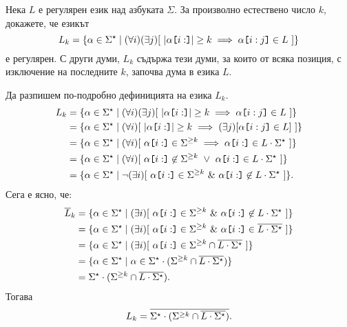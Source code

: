 \begin{extra}
\begin{problem}
  Нека $L$ е регулярен език над азбуката $\Sigma$.
  За произволно естествено число $k$, докажете, че езикът
  \[L_k = \{ \alpha \in \Sigma^\star \mid (\forall i)(\exists j)[\ |\alpha\texttt{[}{i:}\texttt{]}| \geq k \implies \alpha\texttt{[}{i:j}\texttt{]} \in L\ ]\}\]
  е регулярен.
  С други думи, $L_k$ съдържа тези думи, за които от всяка позиция, с изключение на последните $k$, започва дума в езика $L$.
\end{problem}
\ifhints
\begin{hint}
  Да разпишем по-подробно дефиницията на езика $L_k$.
  \begin{align*}
    L_k & = \{ \alpha \in \Sigma^\star \mid (\forall i)(\exists j)[\ |\alpha\slice{i:}| \geq k \implies \alpha\slice{i:j} \in L\ ]\}\\
        & = \{ \alpha \in \Sigma^\star \mid (\forall i)[\ |\alpha\slice{i:}| \geq k \implies (\exists j)[\alpha\slice{i:j} \in L]\ ]\}\\
        & = \{ \alpha \in \Sigma^\star \mid (\forall i)[\ \alpha\slice{i:} \in \Sigma^{\geq k} \implies \alpha\slice{i:} \in L \cdot \Sigma^\star\ ]\}\\
        & = \{ \alpha \in \Sigma^\star \mid (\forall i)[\ \alpha\slice{i:} \not\in \Sigma^{\geq k}\ \lor\ \alpha\slice{i:} \in L \cdot \Sigma^\star\ ]\}\\
        & = \{ \alpha \in \Sigma^\star \mid \neg (\exists i)[\ \alpha\slice{i:} \in \Sigma^{\geq k}\ \&\ \alpha\slice{i:} \not\in L \cdot \Sigma^\star\ ]\}.
  \end{align*}
  Сега е ясно, че:
  \begin{align*}
    \ov{L}_k & = \{ \alpha \in \Sigma^\star \mid (\exists i)[\ \alpha\slice{i:} \in \Sigma^{\geq k}\ \&\ \alpha\slice{i:} \not\in L \cdot \Sigma^\star\ ]\}\\
             & = \{ \alpha \in \Sigma^\star \mid (\exists i)[\ \alpha\slice{i:} \in \Sigma^{\geq k}\ \&\ \alpha\slice{i:} \in \ov{L \cdot \Sigma^\star}\ ]\}\\
             & = \{ \alpha \in \Sigma^\star \mid (\exists i)[\ \alpha\slice{i:} \in \Sigma^{\geq k} \cap \ov{L \cdot \Sigma^\star}\ ]\}\\
             & = \{ \alpha \in \Sigma^\star \mid \alpha \in \Sigma^\star \cdot (\Sigma^{\geq k} \cap \ov{L \cdot \Sigma^\star}) \}\\
             & = \Sigma^\star \cdot (\Sigma^{\geq k} \cap \ov{L \cdot \Sigma^\star}).
  \end{align*}
  Тогава
  \[L_k = \overline{\Sigma^\star \cdot (\Sigma^{\geq k} \cap \overline{L \cdot \Sigma^\star})}.\]
\end{hint}
\fi
\end{extra}


